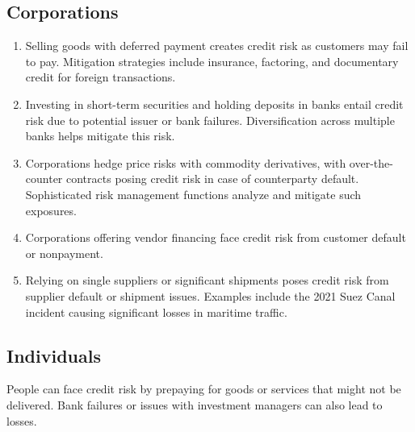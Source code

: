 \subsection*{Corporations}
\begin{enumerate}
\item {} Selling goods with deferred payment creates
credit risk as customers may fail to pay. Mitigation strategies include
insurance, factoring, and documentary credit for foreign transactions.
\item {} Investing in short-term
securities and holding deposits in banks entail credit risk due to potential
issuer or bank failures. Diversification across multiple banks helps mitigate
this risk.
\item {} Corporations hedge price risks with commodity
derivatives, with over-the-counter contracts posing credit risk in case of
counterparty default. Sophisticated risk management functions analyze and
mitigate such exposures.
\item {} Corporations offering vendor financing face
credit risk from customer default or nonpayment.
\item {} Relying on single suppliers or significant shipments
poses credit risk from supplier default or shipment issues. Examples include the
2021 Suez Canal incident causing significant losses in maritime traffic.
\end{enumerate}

\subsection*{Individuals}
People can face credit risk by prepaying for goods or services that might not be
delivered. Bank failures or issues with investment managers can also lead to
losses.

